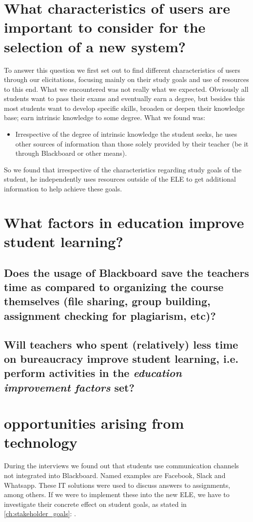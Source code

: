 \section{What characteristics of users are important to consider for the selection of a new system?}
To answer this question we first set out to find different characteristics of users through our elicitations, focusing mainly on their study goals and use of resources to this end. What we encountered was not really what we expected. Obviously all students want to pass their exams and eventually earn a degree, but besides this most students want to develop specific skills, broaden or deepen their knowledge base; earn intrinsic knowledge to some degree. What we found was:
\begin{itemize}
	\item Irrespective of the degree of intrinsic knowledge the student seeks, he uses other sources of information than those solely provided by their teacher (be it through Blackboard or other means).
\end{itemize}
So we found that irrespective of the characteristics regarding study goals of the student, he independently uses resources outside of the ELE to get additional information to help achieve these goals.

\section{What factors in education improve student learning?}
\subsection{Does the usage of Blackboard save the teachers time as compared to organizing the course themselves (file sharing, group building, assignment checking for plagiarism, etc)?}
\label{ss_1}
\subsection{Will teachers who spent (relatively) less time on bureaucracy improve student learning, i.e. perform activities in the \textit{education improvement factors} set?}
\label{ss_2}

\section{opportunities arising from technology}
During the interviews we found out that students use communication channels not integrated into Blackboard. Named examples are Facebook, Slack and Whatsapp. These IT solutions were used to discuss answers to assignments, among others. If we were to implement these into the new ELE, we have to investigate their concrete effect on student goals, as stated in \ref{ch:stakeholder_goals}: .

